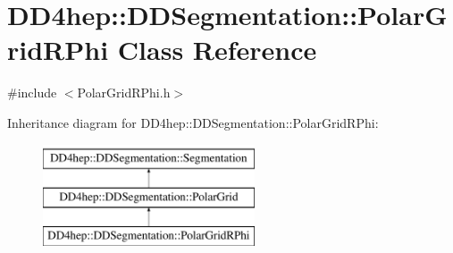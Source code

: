 \hypertarget{class_d_d4hep_1_1_d_d_segmentation_1_1_polar_grid_r_phi}{}\section{D\+D4hep\+:\+:D\+D\+Segmentation\+:\+:Polar\+Grid\+R\+Phi Class Reference}
\label{class_d_d4hep_1_1_d_d_segmentation_1_1_polar_grid_r_phi}


{\ttfamily \#include $<$Polar\+Grid\+R\+Phi.\+h$>$}

Inheritance diagram for D\+D4hep\+:\+:D\+D\+Segmentation\+:\+:Polar\+Grid\+R\+Phi\+:\begin{figure}[H]
\begin{center}
\leavevmode
\includegraphics[height=3.000000cm]{class_d_d4hep_1_1_d_d_segmentation_1_1_polar_grid_r_phi}
\end{center}
\end{figure}
